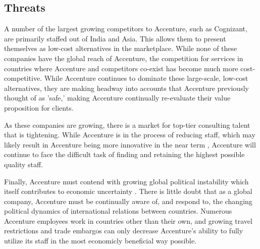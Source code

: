\subsection{Threats}

A number of the largest growing competitors to Accenture, such as Cognizant, are primarily staffed out of India and Asia. This allows them to present themselves as low-cost alternatives in the marketplace. While none of these companies have the global reach of Accenture, the competition for services in countries where Accenture and competitors co-exist has become much more cost-competitive. While Accenture continues to dominate these large-scale, low-cost alternatives, they are making headway into accounts that Accenture previously thought of as 'safe,' making Accenture continually re-evaluate their value proposition for clients.

As these companies are growing, there is a market for top-tier consulting talent that is tightening. While Accenture is in the process of reducing staff, which may likely result in Accenture being more innovative in the near term \parencite{ritter-hayashiSuccessBelongsFlexible2020}, Accenture will continue to face the difficult task of finding and retaining the highest possible quality staff.

Finally, Accenture must contend with growing global political instability which itself contributes to economic uncertainty \parencite{siuChinaBeltRoad2019}. There is little doubt that as a global company, Accenture must be continually aware of, and respond to, the changing political dynamics of international relations between countries. Numerous Accenture employees work in countries other than their own, and growing travel restrictions and trade embargos can only decrease Accenture's ability to fully utilize its staff in the most economicly beneficial way possible.
